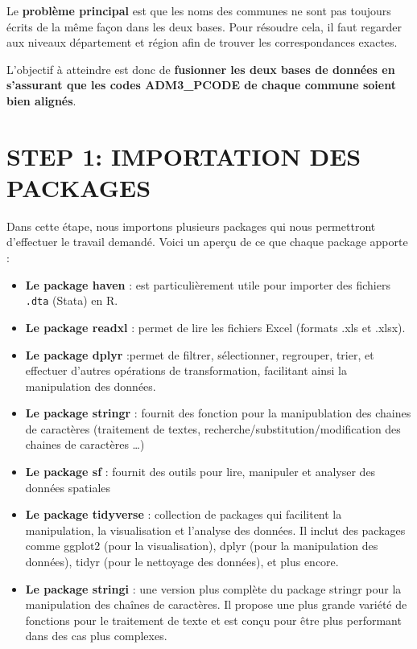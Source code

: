 \documentclass[
]{article}
\providecommand{\tightlist}{%
  \setlength{\itemsep}{0pt}\setlength{\parskip}{0pt}}
\begin{document}
Le \textbf{problème principal} est que les noms des communes ne sont pas
toujours écrits de la même façon dans les deux bases. Pour résoudre
cela, il faut regarder aux niveaux département et région afin de trouver
les correspondances exactes.

L'objectif à atteindre est donc de \textbf{fusionner les deux bases de
données en s'assurant que les codes ADM3\_PCODE de chaque commune soient
bien alignés}.

\newpage
{}
\section*{\centering \Huge STEP 1: IMPORTATION DES PACKAGES}

Dans cette étape, nous importons plusieurs packages qui nous permettront
d'effectuer le travail demandé. Voici un aperçu de ce que chaque package
apporte :

\begin{itemize}
\tightlist
\item
  \textbf{Le package haven} : est particulièrement utile pour importer
  des fichiers \texttt{.dta} (Stata) en R.
\item
  \textbf{Le package readxl} : permet de lire les fichiers Excel
  (formats .xls et .xlsx).
\item
  \textbf{Le package dplyr} :permet de filtrer, sélectionner, regrouper,
  trier, et effectuer d'autres opérations de transformation, facilitant
  ainsi la manipulation des données.
\item
  \textbf{Le package stringr} : fournit des fonction pour la
  manipublation des chaines de caractères (traitement de textes,
  recherche/substitution/modification des chaines de caractères \ldots)
\item
  \textbf{Le package sf} : fournit des outils pour lire, manipuler et
  analyser des données spatiales
\item
  \textbf{Le package tidyverse} : collection de packages qui facilitent
  la manipulation, la visualisation et l'analyse des données. Il inclut
  des packages comme ggplot2 (pour la visualisation), dplyr (pour la
  manipulation des données), tidyr (pour le nettoyage des données), et
  plus encore.
\item
  \textbf{Le package stringi} : une version plus complète du package
  stringr pour la manipulation des chaînes de caractères. Il propose une
  plus grande variété de fonctions pour le traitement de texte et est
  conçu pour être plus performant dans des cas plus complexes.
\end{itemize}
\end{document}

